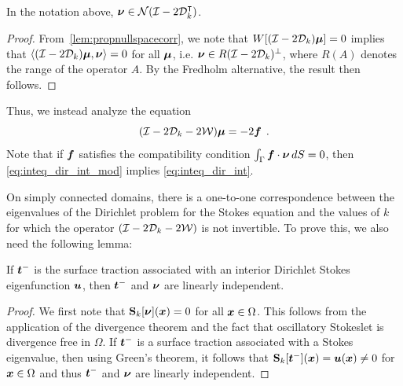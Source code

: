 \begin{lem}
  \label{lem:nunull} In the notation above,
  ${\boldsymbol \nu} \in {\mathcal N}(\mathcal I - 2{\mathcal D}_{k}^{\intercal})$.
\end{lem}
\begin{proof}
From~\cref{lem:propnullspacecorr}, we note that
$W[(\mathcal I - 2{\mathcal D}_{k}){\boldsymbol \mu}] =0$ implies that
$\left<(\mathcal I -2{\mathcal D}_{k}){\boldsymbol \mu} ,{\boldsymbol \nu} \right> = 0$ for
all ${\boldsymbol \mu}$, i.e. ${\boldsymbol \nu} \in R(\mathcal I - 2{\mathcal D}_{k})^{\perp}$, where
$R(A)$ denotes the range of the operator $A$. 
By the Fredholm alternative, the result then follows.
\end{proof}
Thus, we instead analyze the equation
\begin{equation}
(\mathcal I - 2{\mathcal D}_{k}  -2{\mathcal W}) {\boldsymbol \mu} = -2{\boldsymbol f} \; \, . \label{eq:inteq_dir_int_mod}
\end{equation}
Note that if ${\boldsymbol f}$ satisfies the compatibility
condition $\int_\Gamma {\boldsymbol f} \cdot {\boldsymbol \nu} \, dS =0$, then
\cref{eq:inteq_dir_int_mod} implies \cref{eq:inteq_dir_int}.

On simply connected domains, there is a one-to-one correspondence between
the eigenvalues of the Dirichlet problem for
the Stokes equation
and the values of $k$ for which the operator $(\mathcal I - 2{\mathcal D}_{k} - 2{\mathcal W})$
is not invertible. To prove this, we also need the 
following lemma:
\begin{lem}
  \label{lem:nutracli}
  If ${\boldsymbol t}^{-}$ is the surface traction associated
  with an interior Dirichlet Stokes eigenfunction ${\boldsymbol u}$,
  then ${\boldsymbol t}^{-}$ and ${\boldsymbol \nu}$ are linearly independent.
\end{lem}
\begin{proof}
We first note that ${\bf S}_{k}[{\boldsymbol \nu}]({\boldsymbol x}) = 0$ for all ${\boldsymbol x} \in \Omega$.
This follows from the application of the divergence theorem and the fact that
oscillatory Stokeslet is divergence free in $\Omega$. 
If ${\boldsymbol t}^{-}$ is a surface traction associated with a Stokes eigenvalue, then
using Green's theorem, it follows that
${\bf S}_{k}[{\boldsymbol t}^{-}]({\boldsymbol x}) = {\boldsymbol u}({\boldsymbol x}) \neq 0$ for ${\boldsymbol x} \in \Omega$ and
thus ${\boldsymbol t}^{-}$ and ${\boldsymbol \nu}$ are linearly independent.
\end{proof}

